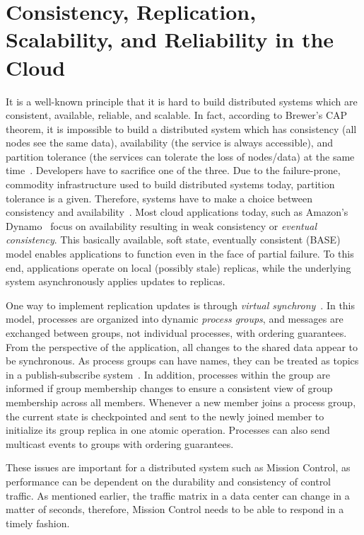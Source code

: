 \documentclass[a4paper,12pt,twoside,openright]{report}
\begin{document}
\section{Consistency, Replication, Scalability, and Reliability in the
Cloud}\label{chapter:background:section:consistency}
It is a well-known principle that it is hard to build distributed systems which
are consistent, available, reliable, and scalable. In fact, according to
Brewer's CAP theorem, it is impossible to build a distributed system which has
consistency (all nodes see the same data), availability (the service is always
accessible), and partition tolerance (the services can tolerate the loss of
nodes/data) at the same time~\cite{Brewer:2000:TRD,Gilbert:2002:BCF}. Developers
have to sacrifice one of the three. Due to the failure-prone, commodity
infrastructure used to build distributed systems today, partition tolerance is a
given. Therefore, systems have to make a choice between consistency and
availability~\cite{Vogels:2009:EC}. Most cloud applications today, such as
Amazon's Dynamo~\cite{DeCandia:2007:DAH} focus on availability resulting in weak
consistency or \emph{eventual consistency}. This basically available, soft
state, eventually consistent (BASE)~\cite{Pritchett:2008:BAA} model enables
applications to function even in the face of partial failure. To this end,
applications operate on local (possibly stale) replicas, while the underlying
system asynchronously applies updates to replicas.

One way to implement replication updates is through \emph{virtual
synchrony}~\cite{Birman:1987:EVS}. In this model, processes are organized into
dynamic \emph{process groups}, and messages are exchanged between groups, not
individual processes, with ordering guarantees. From the perspective of the
application, all changes to the shared data appear to be synchronous. As process
groups can have names, they can be treated as topics in a publish-subscribe
system~\cite{Birman:2010:AHO}. In addition, processes within the group are
informed if group membership changes to ensure a consistent view of group
membership across all members. Whenever a new member joins a process group, the
current state is checkpointed and sent to the newly joined member to initialize
its group replica in one atomic operation. Processes can also send multicast
events to groups with ordering guarantees.

These issues are important for a distributed system such as Mission Control, as
performance can be dependent on the durability and consistency of control
traffic. As mentioned earlier, the traffic matrix in a data center can change in
a matter of seconds, therefore, Mission Control needs to be able to respond in a
timely fashion.
\end{document}
